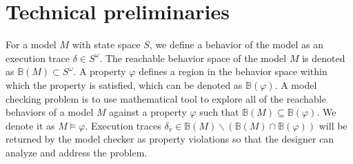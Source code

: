 \section{Technical preliminaries}
\label{preliminaries}
For a model $M$ with state space $S$, we define a behavior of the model as an execution trace $\delta\in S^\omega$. The reachable behavior space of the model $M$ is denoted as $\mathbb{B}(M)\subset S^\omega$. A property $\varphi$ defines a region in the behavior space within which the property is satisfied, which can be denoted as $\mathbb{B}(\varphi)$. A model checking problem is to use mathematical tool to explore all of the reachable behaviors of a model $M$ against a property $\varphi$ such that $\mathbb{B}(M)\subseteq \mathbb{B}(\varphi)$. We denote it as $M\models\varphi$. Execution traces $\delta_v\in\mathbb{B}(M)\backslash (\mathbb{B}(M)\cap\mathbb{B}(\varphi))$ will be returned by the model checker as property violations so that the designer can analyze and address the problem. 

%

